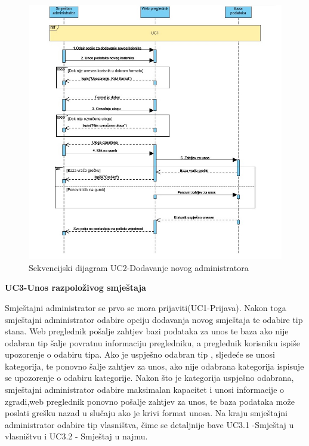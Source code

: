 				\begin{figure}[H]
					\includegraphics[width=\linewidth]{slike/DentAll-Sekvencijski-uc2-Dodavanje_novog_administratora.jpeg}
					\centering
					\caption{Sekvencijski dijagram UC2-Dodavanje novog administratora}
					\label{fig:Sekvencijski dijagram UC2}
				\end{figure}
				
				\newpage
				
				
				\textbf{UC3-Unos razpoloživog smještaja}
				
				{Smještajni administrator se prvo se mora prijaviti(UC1-Prijava). Nakon toga smještajni administrator odabire opciju dodavanja novog smještaja te odabire tip stana. Web preglednik pošalje zahtjev bazi podataka za unos te baza ako nije odabran tip šalje povratnu informaciju pregledniku, a preglednik korisniku ispiše upozorenje o odabiru tipa. Ako je uspješno odabran tip , sljedeće se unosi kategorija, te ponovno šalje zahtjev za unos, ako nije odabrana kategorija ispisuje se upozorenje o odabiru kategorije. Nakon što je kategorija uspješno odabrana, smještajni administrator odabire maksimalan kapacitet i unosi informacije o zgradi,web preglednik ponovno pošalje zahtjev za unos, te baza podataka može poslati grešku nazad u slučaju ako je krivi format unosa. Na kraju smještajni administrator odabire tip vlasništva, čime se detaljnije bave UC3.1 -Smještaj u vlasništvu i UC3.2 - Smještaj u najmu.}
				

